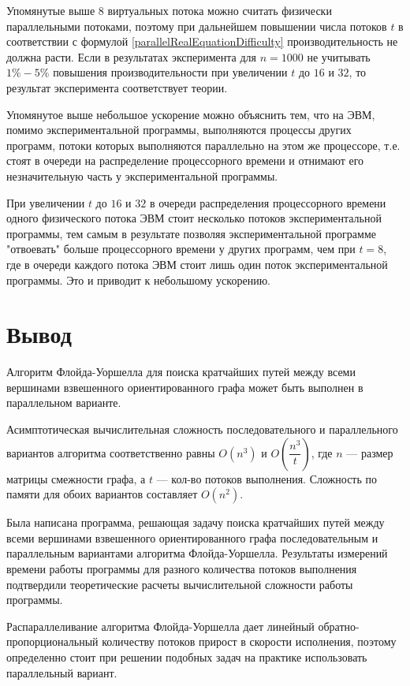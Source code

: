 \documentclass{article}
\begin{document}
	Упомянутые выше $8$ виртуальных потока можно считать физически параллельными потоками, поэтому при дальнейшем повышении числа потоков $t$ в соответствии с формулой \ref{parallelRealEquationDifficulty} производительность не должна расти. Если в результатах эксперимента для $n=1000$ не учитывать $1\%-5\%$ повышения производительности при увеличении $t$ до $16$ и $32$, то результат эксперимента соответствует теории.
	
	Упомянутое выше небольшое ускорение можно объяснить тем, что на ЭВМ, помимо экспериментальной программы, выполняются процессы других программ, потоки которых выполняются параллельно на этом же процессоре, т.е. стоят в очереди на распределение процессорного времени и отнимают его незначительную часть у экспериментальной программы.
	
	При увеличении $t$ до $16$ и $32$ в очереди распределения процессорного времени одного физического потока ЭВМ стоит несколько потоков экспериментальной программы, тем самым в результате позволяя экспериментальной программе "отвоевать" больше процессорного времени у других программ, чем при $t = 8$, где в очереди каждого потока ЭВМ стоит лишь один поток экспериментальной программы. Это и приводит к небольшому ускорению.

\section{Вывод}

	Алгоритм Флойда-Уоршелла для поиска кратчайших путей между всеми вершинами взвешенного ориентированного графа может быть выполнен в параллельном варианте.
	
	Асимптотическая вычислительная сложность последовательного и параллельного вариантов алгоритма соответственно равны $O(n^3)$ и $O(\dfrac{n^3}{t})$, где $n$ --- размер матрицы смежности графа, а $t$ --- кол-во потоков выполнения. Сложность по памяти для обоих вариантов составляет $O(n^2)$.
	
	Была написана программа, решающая задачу поиска кратчайших путей между всеми вершинами взвешенного ориентированного графа последовательным и параллельным вариантами алгоритма Флойда-Уоршелла. Результаты измерений времени работы программы для разного количества потоков выполнения подтвердили теоретические расчеты вычислительной сложности работы программы.
	
	Распараллеливание алгоритма Флойда-Уоршелла дает линейный обратно-пропорциональный количеству потоков прирост в скорости исполнения, поэтому определенно стоит при решении подобных задач на практике использовать параллельный вариант.
\end{document}
